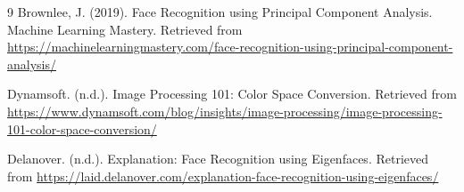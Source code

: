 \documentclass[12pt]{article}
\begin{document}
\begin{thebibliography}{9}
Brownlee, J. (2019). Face Recognition using Principal Component Analysis. Machine Learning Mastery. Retrieved from \url{https://machinelearningmastery.com/face-recognition-using-principal-component-analysis/}

Dynamsoft. (n.d.). Image Processing 101: Color Space Conversion. Retrieved from \url{https://www.dynamsoft.com/blog/insights/image-processing/image-processing-101-color-space-conversion/}

Delanover. (n.d.). Explanation: Face Recognition using Eigenfaces. Retrieved from \url{https://laid.delanover.com/explanation-face-recognition-using-eigenfaces/}
\end{thebibliography}
\end{document}
